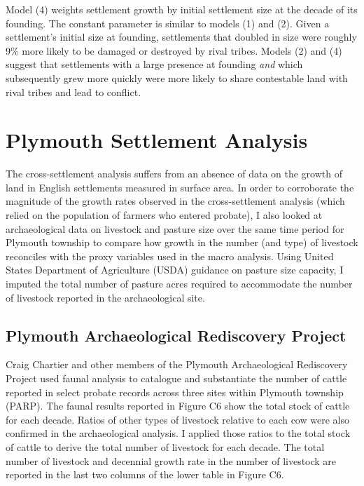 \documentclass[sn-mathphys]{sn-jnl}%
\theoremstyle{thmstyleone}%
\theoremstyle{thmstyletwo}%
\theoremstyle{thmstylethree}%
\begin{document}
Model (4) weights settlement growth by initial settlement size at the decade of its founding. The constant parameter is similar to models (1) and (2). Given a settlement's initial size at founding, settlements that doubled in size were roughly 9\% more likely to be damaged or destroyed by rival tribes. Models (2) and (4) suggest that settlements with a large presence at founding {\em and} which subsequently grew more quickly were more likely to share contestable land with rival tribes and lead to conflict.

\section{Plymouth Settlement Analysis}\label{sec5}

The cross-settlement analysis suffers from an absence of data on the growth of land in English settlements measured in surface area. In order to corroborate the magnitude of the growth rates observed in the cross-settlement analysis (which relied on the population of farmers who entered probate), I also looked at archaeological data on livestock and pasture size over the same time period for Plymouth township to compare how growth in the number (and type) of livestock reconciles with the proxy variables used in the macro analysis. Using United States Department of Agriculture (USDA) guidance on pasture size capacity, I imputed the total number of pasture acres required to accommodate the number of livestock reported in the archaeological site.

\subsection{Plymouth Archaeological Rediscovery Project}

Craig Chartier and other members of the Plymouth Archaeological Rediscovery Project used faunal analysis to catalogue and substantiate the number of cattle reported in select probate records across three sites within Plymouth township (PARP). The faunal results reported in Figure C6 show the total stock of cattle for each decade. Ratios of other types of livestock relative to each cow were also confirmed in the archaeological analysis. I applied those ratios to the total stock of cattle to derive the total number of livestock for each decade. The total number of livestock and decennial growth rate in the number of livestock are reported in the last two columns of the lower table in Figure C6.
\end{document}
